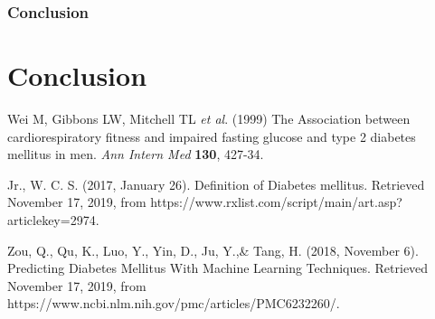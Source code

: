 \documentclass[12pt]{article}
\begin{document}

\newpage
\section{Conclusion}

\newpage

\part{Conclusion}

\clearpage

\newpage

\begin{thebibliography}{}

Wei M, Gibbons LW, Mitchell TL \textit{et al}. (1999) The Association between cardiorespiratory fitness and impaired fasting glucose and type 2 diabetes mellitus in men. \textit{Ann Intern Med} \textbf{130}, 427-34.

Jr., W. C. S. (2017, January 26). Definition of Diabetes mellitus. Retrieved November 17, 2019, from https://www.rxlist.com/script/main/art.asp?articlekey=2974.

Zou, Q., Qu, K., Luo, Y., Yin, D., Ju, Y.,\& Tang, H. (2018, November 6). Predicting Diabetes Mellitus With Machine Learning Techniques. Retrieved November 17, 2019, from https://www.ncbi.nlm.nih.gov/pmc/articles/PMC6232260/.

\end{thebibliography}
\end{document}
